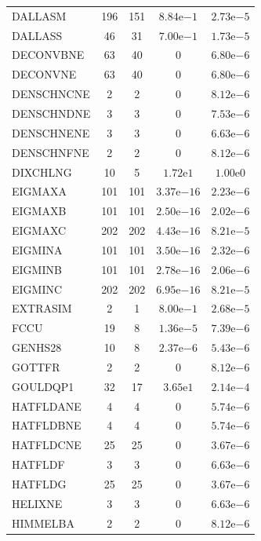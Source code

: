 \documentclass[11pt]{article}
\begin{document}
\begin{center}
\begin{longtable}{lcccc}
DALLASM & 196 & 151 & $8.84\mathrm{e}{-1}$ & $2.73\mathrm{e}{-5}$\\
DALLASS & 46 & 31 & $7.00\mathrm{e}{-1}$ & $1.73\mathrm{e}{-5}$\\
DECONVBNE & 63 & 40 & $0$ & $6.80\mathrm{e}{-6}$\\
DECONVNE & 63 & 40 & $0$ & $6.80\mathrm{e}{-6}$\\
DENSCHNCNE & 2 & 2 & $0$ & $8.12\mathrm{e}{-6}$\\
DENSCHNDNE & 3 & 3 & $0$ & $7.53\mathrm{e}{-6}$\\
DENSCHNENE & 3 & 3 & $0$ & $6.63\mathrm{e}{-6}$\\
DENSCHNFNE & 2 & 2 & $0$ & $8.12\mathrm{e}{-6}$\\
DIXCHLNG & 10 & 5 & $1.72\mathrm{e}{1}$ & $1.00\mathrm{e}{0}$\\
EIGMAXA & 101 & 101 & $3.37\mathrm{e}{-16}$ & $2.23\mathrm{e}{-6}$\\
EIGMAXB & 101 & 101 & $2.50\mathrm{e}{-16}$ & $2.02\mathrm{e}{-6}$\\
EIGMAXC & 202 & 202 & $4.43\mathrm{e}{-16}$ & $8.21\mathrm{e}{-5}$\\
EIGMINA & 101 & 101 & $3.50\mathrm{e}{-16}$ & $2.32\mathrm{e}{-6}$\\
EIGMINB & 101 & 101 & $2.78\mathrm{e}{-16}$ & $2.06\mathrm{e}{-6}$\\
EIGMINC & 202 & 202 & $6.95\mathrm{e}{-16}$ & $8.21\mathrm{e}{-5}$\\
EXTRASIM & 2 & 1 & $8.00\mathrm{e}{-1}$ & $2.68\mathrm{e}{-5}$\\
FCCU & 19 & 8 & $1.36\mathrm{e}{-5}$ & $7.39\mathrm{e}{-6}$\\
GENHS28 & 10 & 8 & $2.37\mathrm{e}{-6}$ & $5.43\mathrm{e}{-6}$\\
GOTTFR & 2 & 2 & $0$ & $8.12\mathrm{e}{-6}$\\
GOULDQP1 & 32 & 17 & $3.65\mathrm{e}{1}$ & $2.14\mathrm{e}{-4}$\\
HATFLDANE & 4 & 4 & $0$ & $5.74\mathrm{e}{-6}$\\
HATFLDBNE & 4 & 4 & $0$ & $5.74\mathrm{e}{-6}$\\
HATFLDCNE & 25 & 25 & $0$ & $3.67\mathrm{e}{-6}$\\
HATFLDF & 3 & 3 & $0$ & $6.63\mathrm{e}{-6}$\\
HATFLDG & 25 & 25 & $0$ & $3.67\mathrm{e}{-6}$\\
HELIXNE & 3 & 3 & $0$ & $6.63\mathrm{e}{-6}$\\
HIMMELBA & 2 & 2 & $0$ & $8.12\mathrm{e}{-6}$\\

\end{longtable}
\end{center}
\end{document}
